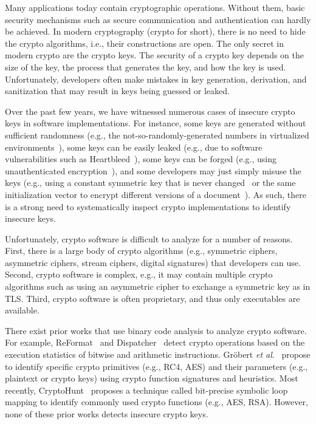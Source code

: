 Many applications today contain cryptographic operations. Without them, basic security mechanisms such as secure communication and authentication can hardly be achieved. In modern cryptography (crypto for short), there is no need to hide the crypto algorithms, i.e., their constructions are open.
The only secret in modern crypto are the crypto keys. The security of a crypto key depends on the size of the key, the process that generates the key, and how the key is used. Unfortunately, developers often make mistakes in key generation, derivation, and sanitization that may result in keys being  guessed or leaked.

Over the past few years, we have witnessed numerous cases of insecure crypto keys in software implementations. For instance, some keys are generated without sufficient randomness (e.g., the not-so-randomly-generated numbers in virtualized environments~\cite{everspaugh2014not}), some keys can be easily leaked (e.g., due to software vulnerabilities such as Heartbleed~\cite{durumeric2014matter}), some keys can be forged (e.g., using unauthenticated encryption~\cite{duong2011cryptography}), and some developers may just simply misuse the keys (e.g., using a constant symmetric key that is never changed~\cite{egele2013empirical} or the same initialization vector  to encrypt different versions of a document~\cite{wu2005misuse}). As such, there is a strong need to systematically inspect crypto implementations to identify insecure keys.

Unfortunately, crypto software is difficult to analyze for a number of reasons. First, there is a large body of crypto algorithms (e.g., symmetric ciphers, asymmetric ciphers, stream ciphers, digital signatures) that developers can use. Second, crypto software is complex, e.g., it may contain multiple crypto algorithms such as using an asymmetric cipher to exchange a symmetric key as in TLS. Third, crypto software is often proprietary, and thus only  executables are available. 

There exist prior works that use binary code analysis to analyze crypto software. 
For example, \textsf{\small ReFormat}~\cite{wang2009reformat} and \textsf{\small Dispatcher}~\cite{caballero2009dispatcher} detect crypto operations based on the execution statistics of bitwise and arithmetic instructions. %
Gr{\"o}bert \emph{et al}.~\cite{grobert2011automated} propose to identify specific crypto primitives (e.g., \textsf{\small RC4, AES}) and their parameters (e.g., plaintext or crypto keys)  using crypto function signatures and heuristics. %
Most recently, \textsf{\small CryptoHunt}~\cite{xu2017cryptographic} proposes a technique called bit-precise symbolic loop mapping to identify commonly used crypto functions (e.g., \textsf{\small AES, RSA}).
However, none of these prior works detects insecure crypto keys.

